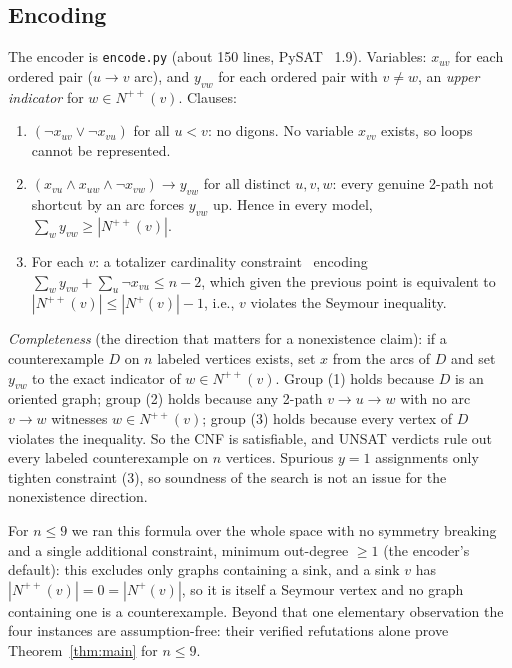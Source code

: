 \documentclass[11pt]{article}
\newcommand{\Nout}{N^{+}}
\newcommand{\Nsec}{N^{++}}
\begin{document}
\subsection{Encoding}\label{sec:encoding}

The encoder is \texttt{encode.py} (about 150 lines, PySAT~\cite{PySAT}
1.9). Variables: $x_{uv}$ for each ordered pair ($u \to v$ arc), and
$y_{vw}$ for each ordered pair with $v \ne w$, an \emph{upper indicator}
for $w \in \Nsec(v)$. Clauses:

\begin{enumerate}
\item $(\lnot x_{uv} \lor \lnot x_{vu})$ for all $u < v$: no digons. No
variable $x_{vv}$ exists, so loops cannot be represented.
\item $(x_{vu} \land x_{uw} \land \lnot x_{vw}) \to y_{vw}$ for all
distinct $u, v, w$: every genuine 2-path not shortcut by an arc forces
$y_{vw}$ up. Hence in every model,
$\sum_w y_{vw} \ge |\Nsec(v)|$.
\item For each $v$: a totalizer cardinality
constraint~\cite{Bailleux03} encoding
$\sum_{w} y_{vw} + \sum_{u} \lnot x_{vu} \le n-2$, which given the
previous point is equivalent to $|\Nsec(v)| \le |\Nout(v)| - 1$, i.e.,
$v$ violates the Seymour inequality.
\end{enumerate}

\emph{Completeness} (the direction that matters for a nonexistence claim):
if a counterexample $D$ on $n$ labeled vertices exists, set $x$ from the
arcs of $D$ and set $y_{vw}$ to the exact indicator of $w \in \Nsec(v)$.
Group (1) holds because $D$ is an oriented graph; group (2) holds because
any 2-path $v \to u \to w$ with no arc $v \to w$ witnesses
$w \in \Nsec(v)$; group (3) holds because every vertex of $D$ violates the
inequality. So the CNF is satisfiable, and UNSAT verdicts rule out every
labeled counterexample on $n$ vertices. Spurious $y = 1$ assignments only
tighten constraint (3), so soundness of the search is not an issue for the
nonexistence direction.

For $n \le 9$ we ran this formula over the whole space with no symmetry
breaking and a single additional constraint, minimum out-degree $\ge 1$
(the encoder's default): this excludes only graphs containing a sink, and
a sink $v$ has $|\Nsec(v)| = 0 = |\Nout(v)|$, so it is itself a Seymour
vertex and no graph containing one is a counterexample. Beyond that one
elementary observation the four instances are assumption-free: their
verified refutations alone prove Theorem~\ref{thm:main} for $n \le 9$.
\end{document}
